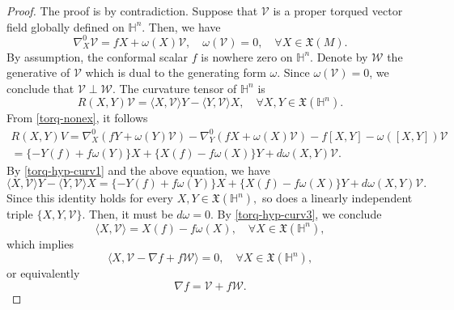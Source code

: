\documentclass[12pt]{amsart}
\def\h{\mathbb H}
\theoremstyle{definition}
\begin{document}
\begin{proof}
The proof is by contradiction. Suppose that $\mathcal{V}$ is a proper torqued vector field globally defined on $\h^n$. Then, we have
\begin{equation} \label{torq-nonex}
\nabla^0_X \mathcal{V}=f X +  \omega(X) \mathcal{V}, \quad \omega(\mathcal{V})=0,  \quad \forall X\in \mathfrak{X}(M).
\end{equation}
By assumption, the conformal scalar $f$ is nowhere zero on $\h^n$. Denote by $\mathcal{W}$ the generative of $\mathcal{V}$ which is dual to the generating form $\omega$. Since $\omega (\mathcal{V})=0$, we conclude that $\mathcal{V} \perp \mathcal{W}$. The curvature tensor of $\h^n$ is%
\begin{equation} \label{torq-hyp-curv1}
R(X,Y)\mathcal{V}=\langle X,\mathcal{V}\rangle Y-\langle Y,%
\mathcal{V}\rangle X, \quad \forall X,Y\in \mathfrak{X}(\h^n)  .
\end{equation}%
From \eqref{torq-nonex}, it follows
\begin{eqnarray}  \label{torq-hyp-curv2}
R(X,Y)V =\nabla^0 _{X}( fY+\omega (Y)\mathcal{V}) -\nabla^0 _{Y}(
fX+\omega (X)\mathcal{V}) -  f[X,Y]-\omega ( [ X,Y]) \mathcal{V}  \nonumber \\
=\{ -Y(f)+f\omega (Y)\} X+\{ X(f)-f\omega (X)\} Y 
+d\omega (X,Y)\mathcal{V}.   \nonumber
\end{eqnarray}%
By \eqref{torq-hyp-curv1} and the above equation, we have%
\begin{equation} \label{torq-hyp-curv3}
\langle X,\mathcal{V}\rangle Y-\langle Y,\mathcal{V}%
\rangle X =\{ -Y(f)+f\omega (Y)\} X+\{ X(f)-f\omega (X)\}
Y+d\omega (X,Y)\mathcal{V}.  
\end{equation}%
Since this identity holds for every $X,Y\in \mathfrak{X}(\mathfrak{\mathbb{H}%
}^{n}),$ so does a linearly independent triple $\{ X,Y,\mathcal{V}%
\} $. Then, it must be $d\omega =0$. By \eqref{torq-hyp-curv3}, we conclude%
\begin{equation*}
\langle X,\mathcal{V}\rangle =X(f)-f\omega (X), \quad \forall X\in \mathfrak{X}(\h^n),    
\end{equation*}
which implies%
\begin{equation*}
\langle X,\mathcal{V}-\nabla f+f\mathcal{W}\rangle =0, \quad \forall X\in \mathfrak{X}(\h^n),    
\end{equation*}
or equivalently
\begin{equation*}
\nabla f=\mathcal{V}+f\mathcal{W}.    
\end{equation*}


\end{proof}
\end{document}
